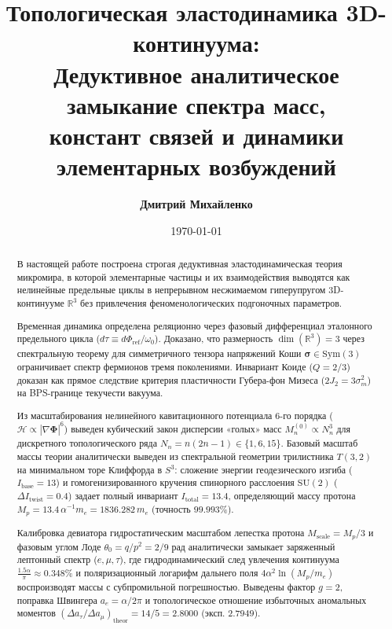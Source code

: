 \documentclass[12pt,a4paper]{article}
\title{\textbf{Топологическая эластодинамика 3D-континуума:\\ Дедуктивное аналитическое замыкание спектра масс,\\ констант связей и динамики элементарных возбуждений}}
\author{\textbf{Дмитрий Михайленко}}
\date{\today}
\begin{document}
	
	\maketitle
	
	\begin{abstract}
		В настоящей работе построена строгая дедуктивная эластодинамическая теория микромира, в которой элементарные частицы и их взаимодействия выводятся как нелинейные предельные циклы в непрерывном несжимаемом гиперупругом 3D-континууме $\mathbb{R}^3$ без привлечения феноменологических подгоночных параметров. 
		
		Временная динамика определена реляционно через фазовый дифференциал эталонного предельного цикла ($d\tau \equiv d\Phi_{\text{ref}}/\omega_0$). Доказано, что размерность $\dim(\mathbb{R}^3) = 3$ через спектральную теорему для симметричного тензора напряжений Коши $\boldsymbol{\sigma} \in \mathrm{Sym}(3)$ ограничивает спектр фермионов тремя поколениями. Инвариант Коиде ($Q = 2/3$) доказан как прямое следствие критерия пластичности Губера-фон Мизеса ($2J_2 = 3\sigma_m^2$) на BPS-границе текучести вакуума. 
		
		Из масштабирования нелинейного кавитационного потенциала 6-го порядка ($\mathcal{H} \propto |\nabla\boldsymbol{\Phi}|^6$) выведен кубический закон дисперсии «голых» масс $M_n^{(0)} \propto N_n^3$ для дискретного топологического ряда $N_n = n(2n-1) \in \{1, 6, 15\}$. Базовый масштаб массы теории аналитически выведен из спектральной геометрии трилистника $T(3,2)$ на минимальном торе Клиффорда в $S^3$: сложение энергии геодезического изгиба ($I_{\text{base}} = 13$) и гомогенизированного кручения спинорного расслоения $\mathrm{SU}(2)$ ($\Delta I_{\text{twist}} = 0.4$) задает полный инвариант $I_{\text{total}} = 13.4$, определяющий массу протона $M_p = 13.4 \, \alpha^{-1} m_e = 1836.282 \, m_e$ (точность $99.993\%$).
		
		Калибровка девиатора гидростатическим масштабом лепестка протона $M_{\text{scale}} = M_p/3$ и фазовым углом Лоде $\theta_0 = q/p^2 = 2/9$ рад аналитически замыкает заряженный лептонный спектр ($e, \mu, \tau$), где гидродинамический след увлечения континуума $\frac{1.5\alpha}{\pi} \approx 0.348\%$ и поляризационный логарифм дальнего поля $4\alpha^2\ln(M_p/m_e)$ воспроизводят массы с субпромильной погрешностью. Выведены фактор $g=2$, поправка Швингера $a_e = \alpha/2\pi$ и топологическое отношение избыточных аномальных моментов $(\Delta a_\tau / \Delta a_\mu)_{\text{theor}} = 14/5 = 2.8000$ (эксп. $2.7949$).
		

\end{abstract}
\end{document}
